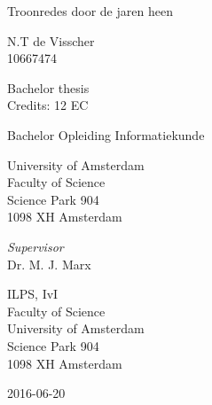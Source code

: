 

\vspace{2.5cm}
\centering
\begin{huge}
Troonredes door de jaren heen
\end{huge}

\vspace{1.5cm}

N.T de Visscher\\
10667474

\vspace{1.5cm}

Bachelor thesis\\
Credits: 12 EC

\vspace{0.5cm}

Bachelor Opleiding Informatiekunde

\vspace{0.25cm}

University of Amsterdam\\
Faculty of Science\\
Science Park 904\\
1098 XH Amsterdam

\vspace{4cm}

\emph{Supervisor}\\
Dr. M. J. Marx

\vspace{0.25cm}

ILPS, IvI\\
Faculty of Science\\
University of Amsterdam\\
Science Park 904\\
1098 XH  Amsterdam

\vspace{1.5cm}

2016-06-20

